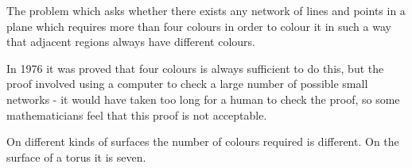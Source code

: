 The problem which asks whether there exists any network of lines and points
in a plane which requires more than four colours in order to colour it in
such a way that adjacent regions always have different colours.
\par
In 1976 it was proved that four colours is always sufficient to do this, 
but the proof involved using a computer to check a large number of possible 
small networks - it would have taken too long for a human to check the
proof, so some mathematicians feel that this proof is not acceptable.
\par
On different kinds of surfaces the number of colours required is different.
On the surface of a torus it is seven.